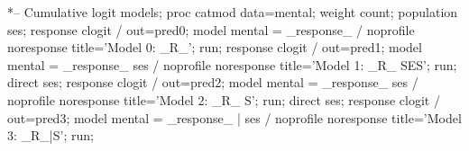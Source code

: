 \begin{listing}

*-- Cumulative logit models;
proc catmod data=mental;
   weight count;
   population ses;
   response clogit / out=pred0;
   model mental = _response_ / noprofile noresponse title='Model 0: _R_';
  run;
   response clogit / out=pred1;
   model mental = _response_  ses / noprofile noresponse title='Model 1: _R_ SES';
  run;
   direct ses;
   response clogit / out=pred2;
   model mental = _response_  ses / noprofile noresponse title='Model 2:  _R_ S';
  run;
   direct ses;
   response clogit / out=pred3;
   model mental = _response_ | ses / noprofile noresponse title='Model 3:  _R_|S';
  run;
\end{listing}
